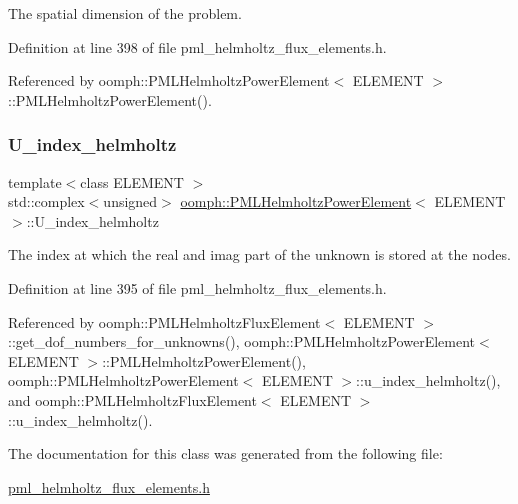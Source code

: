 The spatial dimension of the problem. 



Definition at line 398 of file pml\+\_\+helmholtz\+\_\+flux\+\_\+elements.\+h.



Referenced by oomph\+::\+P\+M\+L\+Helmholtz\+Power\+Element$<$ E\+L\+E\+M\+E\+N\+T $>$\+::\+P\+M\+L\+Helmholtz\+Power\+Element().

\mbox{\label{classoomph_1_1PMLHelmholtzPowerElement_a3da25319b6d812c1c626dc9e52ae9e2c}} 
\subsubsection{\texorpdfstring{U\+\_\+index\+\_\+helmholtz}{U\_index\_helmholtz}}
{\footnotesize\ttfamily template$<$class E\+L\+E\+M\+E\+NT $>$ \\
std\+::complex$<$unsigned$>$ \hyperlink{classoomph_1_1PMLHelmholtzPowerElement}{oomph\+::\+P\+M\+L\+Helmholtz\+Power\+Element}$<$ E\+L\+E\+M\+E\+NT $>$\+::U\+\_\+index\+\_\+helmholtz\hspace{0.3cm}{\ttfamily [protected]}}



The index at which the real and imag part of the unknown is stored at the nodes. 



Definition at line 395 of file pml\+\_\+helmholtz\+\_\+flux\+\_\+elements.\+h.



Referenced by oomph\+::\+P\+M\+L\+Helmholtz\+Flux\+Element$<$ E\+L\+E\+M\+E\+N\+T $>$\+::get\+\_\+dof\+\_\+numbers\+\_\+for\+\_\+unknowns(), oomph\+::\+P\+M\+L\+Helmholtz\+Power\+Element$<$ E\+L\+E\+M\+E\+N\+T $>$\+::\+P\+M\+L\+Helmholtz\+Power\+Element(), oomph\+::\+P\+M\+L\+Helmholtz\+Power\+Element$<$ E\+L\+E\+M\+E\+N\+T $>$\+::u\+\_\+index\+\_\+helmholtz(), and oomph\+::\+P\+M\+L\+Helmholtz\+Flux\+Element$<$ E\+L\+E\+M\+E\+N\+T $>$\+::u\+\_\+index\+\_\+helmholtz().



The documentation for this class was generated from the following file\+:\begin{DoxyCompactItemize}
\item 
\hyperlink{pml__helmholtz__flux__elements_8h}{pml\+\_\+helmholtz\+\_\+flux\+\_\+elements.\+h}\end{DoxyCompactItemize}
